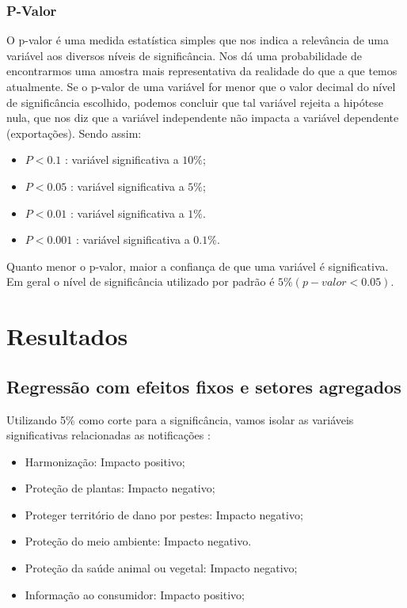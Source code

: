 \documentclass[12pt, a4paper]{article}
\begin{document}
\subsubsection{P-Valor}
O p-valor é uma medida estatística simples que nos indica a relevância de uma variável aos diversos níveis de significância. Nos dá uma probabilidade de encontrarmos uma amostra mais representativa da realidade do que a que temos atualmente. Se o p-valor de uma variável for menor que o valor decimal do nível de significância escolhido, podemos concluir que tal variável rejeita a hipótese nula, que nos diz que a variável independente não impacta a variável dependente (exportações). Sendo assim:

\begin{itemize}
    \item $P < 0.1$ : variável significativa a $10\%$;
    \item $P < 0.05$ : variável significativa a $5\%$;
    \item $P < 0.01$ : variável significativa a $1\%$.
    \item $P < 0.001$ : variável significativa a $0.1\%$.
\end{itemize}

Quanto menor o p-valor, maior a confiança de que uma variável é significativa. Em geral o nível de significância utilizado por padrão é $5\% (p-valor < 0.05)$.


\newpage
\section{Resultados}

\subsection{Regressão com efeitos fixos e setores agregados}



 Utilizando 5\% como corte para a significância, vamos isolar as variáveis significativas relacionadas as notificações :

 \begin{itemize}
         \item Harmonização: Impacto positivo;
         \item Proteção de plantas: Impacto negativo;
         \item Proteger território de dano por pestes: Impacto negativo;
         \item Proteção do meio ambiente: Impacto negativo.
         \item Proteção da saúde animal ou vegetal: Impacto negativo;
         \item Informação ao consumidor: Impacto positivo;
 \end{itemize}
\end{document}
